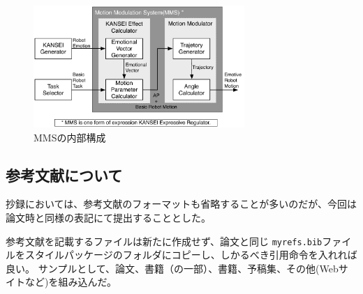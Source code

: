 \documentclass[a4paper,10pt,twocolumn]{jsarticle}
\begin{document}
\begin{figure}[b]
    \centering
    \includegraphics[width=8cm]{MMS.pdf}
    \vspace{-7mm}
    \caption{MMSの内部構成}
    \label{fig:mms}
    \vspace{5mm}
\end{figure}

\subsection{参考文献について}
抄録においては、参考文献のフォーマットも省略することが多いのだが、今回は論文時と同様の表記にて提出することとした。

参考文献を記載するファイルは新たに作成せず、論文と同じ \verb+myrefs.bib+ファイルをスタイルパッケージのフォルダにコピーし、しかるべき引用命令を入れれば良い。
サンプルとして、論文\cite{Kogami2009}、書籍（の一部）\cite{WelfareJapan}、書籍\cite{Nakata2010}、予稿集\cite{Miyaji2003ROMAN}、その他(Webサイトなど)\cite{HTUlatex}を組み込んだ。

%
\end{document}
